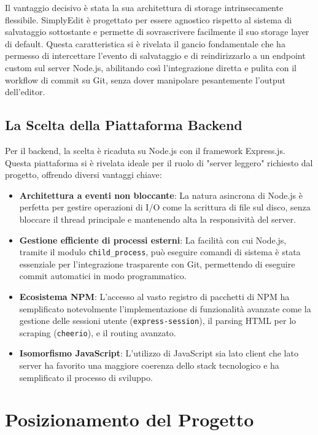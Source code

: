 Il vantaggio decisivo è stata la sua architettura di storage intrinsecamente flessibile. SimplyEdit è progettato per essere agnostico rispetto al sistema di salvataggio sottostante e permette di sovrascrivere facilmente il suo storage layer di default. Questa caratteristica si è rivelata il gancio fondamentale che ha permesso di intercettare l'evento di salvataggio e di reindirizzarlo a un endpoint custom sul server Node.js, abilitando così l'integrazione diretta e pulita con il workflow di commit su Git, senza dover manipolare pesantemente l'output dell'editor.

\subsection{La Scelta della Piattaforma Backend}

Per il backend, la scelta è ricaduta su Node.js con il framework Express.js. Questa piattaforma si è rivelata ideale per il ruolo di "server leggero" richiesto dal progetto, offrendo diversi vantaggi chiave:

\begin{itemize}
    \item \textbf{Architettura a eventi non bloccante}: La natura asincrona di Node.js è perfetta per gestire operazioni di I/O come la scrittura di file sul disco, senza bloccare il thread principale e mantenendo alta la responsività del server.
    \item \textbf{Gestione efficiente di processi esterni}: La facilità con cui Node.js, tramite il modulo \texttt{child\_process}, può eseguire comandi di sistema è stata essenziale per l'integrazione trasparente con Git, permettendo di eseguire commit automatici in modo programmatico.
    \item \textbf{Ecosistema NPM}: L'accesso al vasto registro di pacchetti di NPM ha semplificato notevolmente l'implementazione di funzionalità avanzate come la gestione delle sessioni utente (\texttt{express-session}), il parsing HTML per lo scraping (\texttt{cheerio}), e il routing avanzato.
    \item \textbf{Isomorfismo JavaScript}: L'utilizzo di JavaScript sia lato client che lato server ha favorito una maggiore coerenza dello stack tecnologico e ha semplificato il processo di sviluppo.
\end{itemize}

\section{Posizionamento del Progetto}

